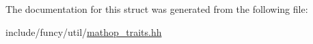 The documentation for this struct was generated from the following file\-:\begin{DoxyCompactItemize}
\item 
include/funcy/util/\hyperlink{mathop__traits_8hh}{mathop\-\_\-traits.\-hh}\end{DoxyCompactItemize}
